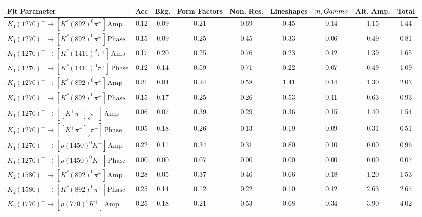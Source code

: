 \begin{tabular}{l  c  c  c  c  c  c  c  | c }
\hline
\hline
Fit Parameter & Acc & Bkg. & Form Factors & Non. Res. & Lineshapes & $m,\\Gamma$ & Alt. Amp. &  Total  \\ 
\hline
$K_{1}(1270)^{+}\rightarrow \left[K^{*}(892)^{0}\pi^{+}\right]\,\text{Amp}$ & 0.12 & 0.09 & 0.21 & 0.69 & 0.45 & 0.14 & 1.15 & 1.44 \\ 
$K_{1}(1270)^{+}\rightarrow \left[K^{*}(892)^{0}\pi^{+}\right]\,\text{Phase}$ & 0.15 & 0.09 & 0.25 & 0.45 & 0.33 & 0.06 & 0.49 & 0.81 \\ 
$K_{1}(1270)^{+}\rightarrow \left[K^{*}(1410)^{0}\pi^{+}\right]\,\text{Amp}$ & 0.17 & 0.20 & 0.25 & 0.76 & 0.23 & 0.12 & 1.39 & 1.65 \\ 
$K_{1}(1270)^{+}\rightarrow \left[K^{*}(1410)^{0}\pi^{+}\right]\,\text{Phase}$ & 0.12 & 0.14 & 0.59 & 0.71 & 0.22 & 0.07 & 0.49 & 1.09 \\ 
$K_{1}(1270)^{+}\rightarrow \left[K^{*}(892)^{0}\pi^{+}\right]\,\text{Amp}$ & 0.21 & 0.04 & 0.24 & 0.58 & 1.41 & 0.14 & 1.30 & 2.03 \\ 
$K_{1}(1270)^{+}\rightarrow \left[K^{*}(892)^{0}\pi^{+}\right]\,\text{Phase}$ & 0.15 & 0.17 & 0.25 & 0.26 & 0.53 & 0.11 & 0.63 & 0.93 \\ 
$K_{1}(1270)^{+}\rightarrow \left[\left[K^{+}\pi^{-}\right]_{\text{S}}\pi^{+}\right]\,\text{Amp}$ & 0.06 & 0.07 & 0.39 & 0.29 & 0.36 & 0.15 & 1.40 & 1.54 \\ 
$K_{1}(1270)^{+}\rightarrow \left[\left[K^{+}\pi^{-}\right]_{\text{S}}\pi^{+}\right]\,\text{Phase}$ & 0.05 & 0.18 & 0.26 & 0.13 & 0.19 & 0.09 & 0.31 & 0.51 \\ 
$K_{1}(1270)^{+}\rightarrow \left[\rho(1450)^{0}K^{+}\right]\,\text{Amp}$ & 0.22 & 0.11 & 0.34 & 0.31 & 0.80 & 0.10 & 0.00 & 0.96 \\ 
$K_{1}(1270)^{+}\rightarrow \left[\rho(1450)^{0}K^{+}\right]\,\text{Phase}$ & 0.00 & 0.00 & 0.07 & 0.00 & 0.00 & 0.00 & 0.00 & 0.07 \\ 
$K_{2}(1580)^{+}\rightarrow \left[K^{*}(892)^{0}\pi^{+}\right]\,\text{Amp}$ & 0.28 & 0.05 & 0.37 & 0.46 & 0.66 & 0.18 & 1.20 & 1.53 \\ 
$K_{2}(1580)^{+}\rightarrow \left[K^{*}(892)^{0}\pi^{+}\right]\,\text{Phase}$ & 0.25 & 0.14 & 0.12 & 0.22 & 0.10 & 0.12 & 2.63 & 2.67 \\ 
$K_{2}(1770)^{+}\rightarrow \left[\rho(770)^{0}K^{+}\right]\,\text{Amp}$ & 0.25 & 0.18 & 0.21 & 0.53 & 0.68 & 0.34 & 3.90 & 4.02 \\ 

\end{tabular}
